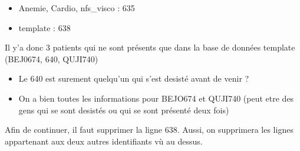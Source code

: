 \documentclass[a4paper,12pt]{article}
\begin{document}
\begin{itemize}
    \item Anemie, Cardio, nfs\_visco : 635
    \item template : 638
\end{itemize}

Il y'a donc 3 patients qui ne sont présents que dans la base de données template (BEJ0674, 640, QUJI740)

\begin{itemize}
    \item Le 640 est surement quelqu'un qui s'est desisté avant de venir ?
    \item On a bien toutes les informations pour BEJO674 et QUJI740 (peut etre des gens qui se sont desistés ou qui se sont présenté deux fois)
\end{itemize}

Afin de continuer, il faut supprimer la ligne 638. Aussi, on supprimera les lignes appartenant aux deux autres identifiants vù au dessus.
\end{document}
